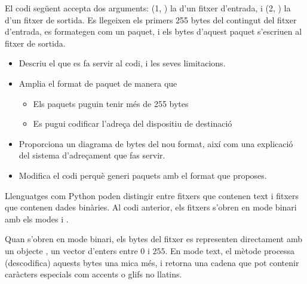 \begin{exercise}
El codi següent accepta dos arguments: (1, ) la  d'un fitxer d'entrada, 
i (2, ) la  d'un fitxer de sortida.
Es llegeixen els primers 255 bytes del contingut del fitxer d'entrada, 
es formategen com un paquet, i els bytes d'aquest paquet
s'escriuen al fitxer de sortida.

\begin{center}
\end{center}

\begin{itemize}
\item Descriu el  que es fa servir al codi, i les seves limitacions.

\item Amplia el format de paquet de manera que 
 \begin{itemize}
   \item Els paquets puguin tenir més de 255 bytes
   \item Es pugui codificar l'adreça del dispositiu de destinació
  \end{itemize}
  
\item Proporciona un diagrama de bytes del nou format, 
així com una explicació del sistema d'adreçament que fas servir.

\item Modifica el codi perquè generi paquets amb el format que proposes.
\end{itemize}
\end{exercise}

\begin{remark}
Llenguatges com Python poden distingir entre fitxers que contenen text i fitxers que contenen dades binàries.
Al codi anterior, els fitxers s'obren en mode binari amb els modes  i .

Quan s'obren en mode binari, els bytes del fitxer es representen directament amb un objecte , un vector 
d'enters entre $0$ i $255$. En mode text, el mètode  processa (descodifica) aquests bytes una mica més,
i retorna una cadena que pot contenir caràcters especials com accents o glifs no llatins. 
\end{remark}

